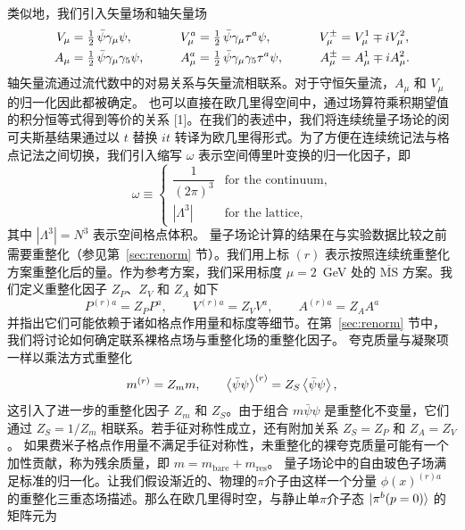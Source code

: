 类似地，我们引入矢量场和轴矢量场
\begin{equation}
\begin{aligned}
V_\mu &= \tfrac{1}{2}\,\bar{\psi}\gamma_\mu\psi , &\qquad
V_\mu^a &= \tfrac{1}{2}\,\bar{\psi}\gamma_\mu\tau^a\psi , &\qquad
V_\mu^\pm &= V_\mu^1 \mp i V_\mu^2 , \\
A_\mu &= \tfrac{1}{2}\,\bar{\psi}\gamma_\mu\gamma_5\psi , &\qquad
A_\mu^a &= \tfrac{1}{2}\,\bar{\psi}\gamma_\mu\gamma_5\tau^a\psi , &\qquad
A_\mu^\pm &= A_\mu^1 \mp i A_\mu^2 .
\end{aligned}
\end{equation}
轴矢量流通过流代数中的对易关系与矢量流相联系。对于守恒矢量流，$A_\mu$ 和 $V_\mu$ 的归一化因此都被确定。
也可以直接在欧几里得空间中，通过场算符乘积期望值的积分恒等式得到等价的关系 [1]。在我们的表述中，我们将连续统量子场论的闵可夫斯基结果通过以 $t$ 替换 $it$ 转译为欧几里得形式。为了方便在连续统记法与格点记法之间切换，我们引入缩写 $\omega$ 表示空间傅里叶变换的归一化因子，即
\begin{equation}
\omega \equiv
\begin{cases}
\dfrac{1}{(2\pi)^3} & \text{for the continuum}, \\[2mm]
|\Lambda^3| & \text{for the lattice},
\end{cases}
\end{equation}
其中 $|\Lambda^3| = N^3$ 表示空间格点体积。
量子场论计算的结果在与实验数据比较之前需要重整化（参见第~\ref{sec:renorm} 节）。我们用上标 $(r)$ 表示按照连续统重整化方案重整化后的量。作为参考方案，我们采用标度 $\mu = 2$~GeV 处的 $\overline{\mathrm{MS}}$ 方案。我们定义重整化因子 $Z_P$、$Z_V$ 和 $Z_A$ 如下
\begin{equation}
P^{(r)a} = Z_P P^a , \qquad
V^{(r)a} = Z_V V^a , \qquad
A^{(r)a} = Z_A A^a
\end{equation}
并指出它们可能依赖于诸如格点作用量和标度等细节。在第~\ref{sec:renorm} 节中，我们将讨论如何确定联系裸格点场与重整化场的重整化因子。
夸克质量与凝聚项一样以乘法方式重整化
\begin{equation}
m^{(r)} = Z_m m , \qquad
\left\langle \bar{\psi}\psi \right\rangle^{(r)} = Z_S \left\langle \bar{\psi}\psi \right\rangle ,
\end{equation}
这引入了进一步的重整化因子 $Z_m$ 和 $Z_S$。由于组合 $m\bar{\psi}\psi$ 是重整化不变量，它们通过 $Z_S = 1/Z_m$ 相联系。若手征对称性成立，还有附加关系 $Z_S = Z_P$ 和 $Z_A = Z_V$。
如果费米子格点作用量不满足手征对称性，未重整化的裸夸克质量可能有一个加性贡献，称为残余质量，即 $m = m_{\mathrm{bare}} + m_{\mathrm{res}}$。
量子场论中的自由玻色子场满足标准的归一化。让我们假设渐近的、物理的$\pi$介子由这样一个分量 $\phi(x)^{(r)a}$ 的重整化三重态场描述。那么在欧几里得时空，与静止单$\pi$介子态 $|\pi^b(p = 0)\rangle$ 的矩阵元为
